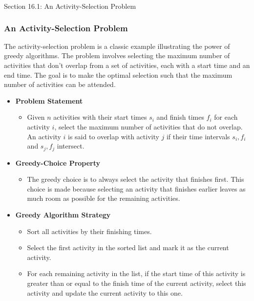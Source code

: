 \begin{notes}{Section 16.1: An Activity-Selection Problem}
    \subsubsection*{An Activity-Selection Problem}

    The activity-selection problem is a classic example illustrating the power of greedy algorithms. The problem involves selecting the maximum number of activities that don't overlap from a set of 
    activities, each with a start time and an end time. The goal is to make the optimal selection such that the maximum number of activities can be attended.
    
    \begin{itemize}
        \item \textbf{Problem Statement}
        \begin{itemize}
            \item Given $n$ activities with their start times $s_i$ and finish times $f_i$ for each activity $i$, select the maximum number of activities that do not overlap. An activity $i$ is said 
            to overlap with activity $j$ if their time intervals $s_i, f_i$ and $s_j, f_j$ intersect.
        \end{itemize}
        
        \item \textbf{Greedy-Choice Property}
        \begin{itemize}
            \item The greedy choice is to always select the activity that finishes first. This choice is made because selecting an activity that finishes earlier leaves as much room as possible for 
            the remaining activities.
        \end{itemize}
        
        \item \textbf{Greedy Algorithm Strategy}
        \begin{itemize}
            \item Sort all activities by their finishing times.
            \item Select the first activity in the sorted list and mark it as the current activity.
            \item For each remaining activity in the list, if the start time of this activity is greater than or equal to the finish time of the current activity, select this activity and update the 
            current activity to this one.
        \end{itemize}
        

\end{itemize}
\end{notes}
